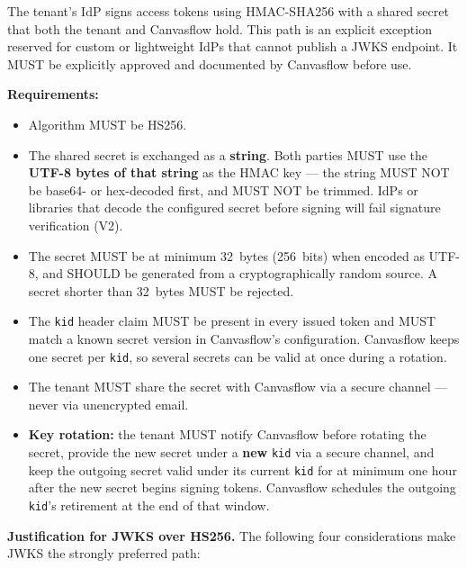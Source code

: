 The tenant's IdP signs access tokens using HMAC-SHA256 with a shared secret that both
the tenant and Canvasflow hold. This path is an explicit exception reserved for custom
or lightweight IdPs that cannot publish a JWKS endpoint. It MUST be explicitly approved
and documented by Canvasflow before use.

\textbf{Requirements:}

\begin{itemize}
  \item Algorithm MUST be HS256.
  \item The shared secret is exchanged as a \textbf{string}. Both parties MUST use the
    \textbf{UTF-8 bytes of that string} as the HMAC key --- the string MUST NOT be
    base64- or hex-decoded first, and MUST NOT be trimmed. IdPs or libraries that decode
    the configured secret before signing will fail signature verification (V2).
  \item The secret MUST be at minimum 32~bytes (256~bits) when encoded as UTF-8, and
    SHOULD be generated from a cryptographically random source. A secret shorter than
    32~bytes MUST be rejected.
  \item The \texttt{kid} header claim MUST be present in every issued token and MUST
    match a known secret version in Canvasflow's configuration. Canvasflow keeps one
    secret per \texttt{kid}, so several secrets can be valid at once during a rotation.
  \item The tenant MUST share the secret with Canvasflow via a secure channel --- never
    via unencrypted email.
  \item \textbf{Key rotation:} the tenant MUST notify Canvasflow before rotating the
    secret, provide the new secret under a \textbf{new} \texttt{kid} via a secure channel,
    and keep the outgoing secret valid under its current \texttt{kid} for at minimum one
    hour after the new secret begins signing tokens. Canvasflow schedules the outgoing
    \texttt{kid}'s retirement at the end of that window.
\end{itemize}

\textbf{Justification for JWKS over HS256.} The following four considerations make JWKS
the strongly preferred path:

